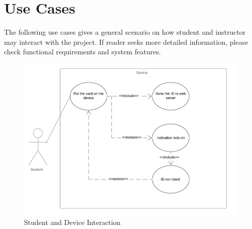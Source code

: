 \documentclass{scrreprt}
\begin{document}
\section{Use Cases}
The following use cases gives a general scenario on how student and instructor may interact with the project. If reader seeks more detailed information, please check functional requirements and system features. 
\begin{figure}[H]
 \begin{center}
	\includegraphics[scale=0.5]{student}
  	\caption{Student and Device Interaction}
  \end{center}
\end{figure}
\end{document}
